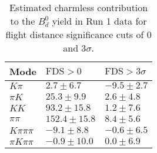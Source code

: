 \begin{table}[h]
  \centering
  \begin{tabular}{lll}
      \toprule
      Mode & $\mathrm{FDS} > 0$ & $\mathrm{FDS} > 3\sigma$ \\
      \midrule
      $K\pi$ & $2.7 \pm 6.7$ & $-9.5 \pm 2.7$ \\
      $\pi K$ & $25.3 \pm 9.9$ & $2.6 \pm 4.8$ \\
      $KK$ & $93.2 \pm 15.8$ & $1.2 \pm 7.6$ \\
      $\pi\pi$ & $152.4 \pm 15.8$ & $8.4 \pm 5.6$ \\
      $K\pi\pi\pi$ & $-9.1 \pm 8.8$ & $-0.6 \pm 6.5$ \\
      $\pi K\pi\pi$ & $-0.9 \pm 10.0$ & $0.0 \pm 6.9$ \\
      \bottomrule
  \end{tabular}
  \caption{\small Estimated charmless contribution to the $B^{0}_{d}$ yield in Run 1 data for flight distance significance cuts of 0  and $3\sigma$.}
\label{tab:charmless_yields_Bd_run_1}
\end{table}
